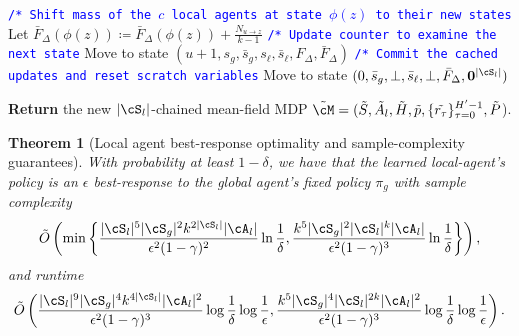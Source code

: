 \documentclass{article}
\theoremstyle{plain}
\newtheorem{theorem}{Theorem}[section]
\theoremstyle{definition}
\begin{document}
\begin{algorithm}[t]
\begin{algorithmic}
        \smallskip
        \STATE \textcolor{blue}{\texttt{/* Shift mass of the $c$ local agents at state $\phi(z)$ to their new states}}
        \smallskip
        \STATE Let $\bar{F}_\Delta(\phi(z))\coloneqq \bar{F}_\Delta(\phi(z)) + \frac{N_{u\to z}}{k-1}$
        \ENDFOR
        \smallskip
        \smallskip
        \STATE \textcolor{blue}{\texttt{/* Update counter to examine the next state}}
        \STATE Move to state $(u+1, s_g, \bar{s}_g, s_\ell, \bar{s}_\ell, F_{\Delta}, \bar{F}_\Delta)$
        \ELSE
        \smallskip
        \STATE \textcolor{blue}{\texttt{/* Commit the cached updates and reset scratch variables}}
        \STATE Move to state $(0, \bar{s}_g, \perp, \bar{s}_\ell, \perp, \bar{F}_{\Delta}, \mathbf{0}^{|\cS_l|})$
        \ENDIF
        \ENDIF
        
        \medskip
        \STATE \textbf{Return} the new $|\cS_l|$-chained mean-field MDP $\tilde{\cM} = (\tilde{S}, \tilde{A}_l, \tilde{H}, \tilde{p}, \{\tilde{r_\tau}\}_{\tau=0}^{H'-1}, \tilde{P}$).
        \STATE 
        \label{algorithm: S chained induced MDP}
    \end{algorithmic}
\end{algorithm}
 
\begin{theorem}[Local agent best-response optimality and sample-complexity guarantees] 
\label{appendix theorem: local agent br optimality}
With probability at least $1-\delta$, we have that the learned local-agent's policy is an $\epsilon$ best-response to the global agent's fixed policy $\pi_g$ with sample complexity
\[\tilde{O}\left(\min\left\{\frac{|\cS_l|^5|\cS_g|^2 k^{2|\cS_l|}|\cA_l|}{\epsilon^2(1-\gamma)^2} \ln \frac1\delta, \frac{k^5  |\cS_g|^2 |\cS_l|^k |\cA_l|}{\epsilon^2(1-\gamma)^3} \ln \frac1\delta\right\}\right),\]
and runtime
\[\tilde{O}\left(\frac{|\cS_l|^9 |\cS_g|^4  k^{4|\cS_l|}|\cA_l|^2}{\epsilon^2(1-\gamma)^3} \log \frac1\delta \log \frac1\epsilon, \frac{k^5  |\cS_g|^4 |\cS_l|^{2k}|\cA_l|^2}{\epsilon^2(1-\gamma)^3} \log \frac1\delta \log \frac1\epsilon\right).\]
\label{thm: local agent optimality and sample complexity}
\end{theorem} 
\end{document}
